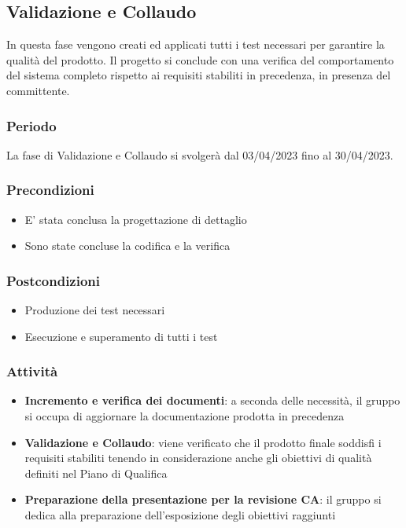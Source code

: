 \subsection{Validazione e Collaudo}
In questa fase vengono creati ed applicati tutti i test necessari per garantire la qualità del prodotto. Il progetto si conclude con una verifica del comportamento del sistema completo rispetto ai requisiti stabiliti in precedenza, in presenza del committente.

\subsubsection{Periodo}
La fase di Validazione e Collaudo si svolgerà dal 03/04/2023 fino al 30/04/2023.

\subsubsection{Precondizioni}
\begin{itemize}
    \item E’ stata conclusa la progettazione di dettaglio
    \item Sono state concluse la codifica e la verifica
\end{itemize}

\subsubsection{Postcondizioni}
\begin{itemize}
    \item Produzione dei test necessari
    \item Esecuzione e superamento di tutti i test
\end{itemize}

\subsubsection{Attività}
\begin{itemize}
    \item \textbf{Incremento e verifica dei documenti}: a seconda delle necessità, il gruppo si occupa di aggiornare la documentazione prodotta in precedenza
    \item \textbf{Validazione e Collaudo}: viene verificato che il prodotto finale soddisfi i requisiti stabiliti tenendo in considerazione anche gli obiettivi di qualità definiti nel Piano di Qualifica
    \item \textbf{Preparazione della presentazione per la revisione CA}: il gruppo si dedica alla preparazione dell’esposizione degli obiettivi raggiunti
\end{itemize}

